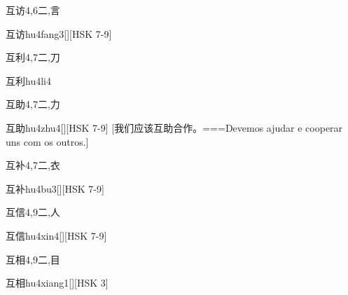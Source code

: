 \begin{Entry}{互访}{4,6}{⼆,⾔}
  \begin{Phonetics}{互访}{hu4fang3}[][HSK 7-9]
  \end{Phonetics}
\end{Entry}

\begin{Entry}{互利}{4,7}{⼆,⼑}
  \begin{Phonetics}{互利}{hu4li4}
  \end{Phonetics}
\end{Entry}

\begin{Entry}{互助}{4,7}{⼆,⼒}
  \begin{Phonetics}{互助}{hu4zhu4}[][HSK 7-9]
    [我们应该互助合作。===Devemos ajudar e cooperar uns com os outros.]
  \end{Phonetics}
\end{Entry}

\begin{Entry}{互补}{4,7}{⼆,⾐}
  \begin{Phonetics}{互补}{hu4bu3}[][HSK 7-9]
  \end{Phonetics}
\end{Entry}

\begin{Entry}{互信}{4,9}{⼆,⼈}
  \begin{Phonetics}{互信}{hu4xin4}[][HSK 7-9]
  \end{Phonetics}
\end{Entry}

\begin{Entry}{互相}{4,9}{⼆,⽬}
  \begin{Phonetics}{互相}{hu4xiang1}[][HSK 3]
  \end{Phonetics}
\end{Entry}

